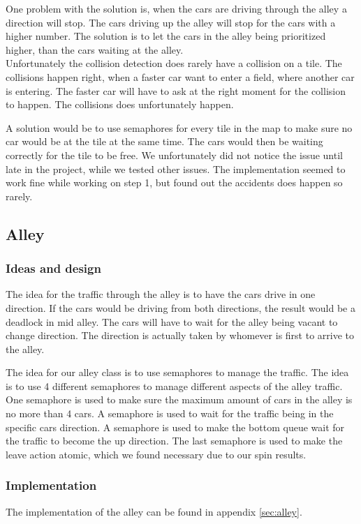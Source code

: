 One problem with the solution is, when the cars are driving through the alley a direction will stop. The cars driving up the alley will stop for the cars with a higher number. The solution is to let the cars in the alley being prioritized higher, than the cars waiting at the alley.
\\

Unfortunately the collision detection does rarely have a collision on a tile. The collisions happen right, when a faster car want to enter a field, where another car is entering. The faster car will have to ask at the right moment for the collision to happen. The collisions does unfortunately happen. 

A solution would be to use semaphores for every tile in the map to make sure no car would be at the tile at the same time. The cars would then be waiting correctly for the tile to be free. We unfortunately did not notice the issue until late in the project, while we tested other issues. The implementation seemed to work fine while working on step 1, but found out the accidents does happen so rarely.

\subsection{Alley}
\subsubsection{Ideas and design}
The idea for the traffic through the alley is to have the cars drive in one direction. If the cars would be driving from both directions, the result would be a deadlock in mid alley. The cars will have to wait for the alley being vacant to change direction. The direction is actually taken by whomever is first to arrive to the alley.

The idea for our alley class is to use semaphores to manage the traffic. The idea is to use 4 different semaphores to manage different aspects of the alley traffic. One semaphore is used to make sure the maximum amount of cars in the alley is no more than 4 cars. A semaphore is used to wait for the traffic being in the specific cars direction. A semaphore is used to make the bottom queue wait for the traffic to become the up direction. The last semaphore is used to make the leave action atomic, which we found necessary due to our spin results. 

\subsubsection{Implementation}
The implementation of the alley can be found in appendix \ref{sec:alley}.
\\

